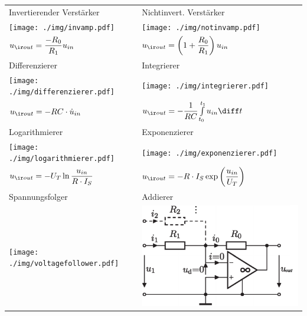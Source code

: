 \documentclass[fs, footer]{latex4ei}
\begin{document}
\begin{multicols*}{4}
    \begin{tabular}{ll}
        Invertierender Verstärker                                & Nichtinvert. Verstärker                                              \\
        \texttt{[image: ./img/invamp.pdf]}          & \texttt{[image: ./img/notinvamp.pdf]}                   \\
        $u_{\ir out} = \frac{-R_0}{R_1} u_{in}$                  & $u_{\ir out} = \left( 1+ \frac{R_0}{R_1} \right) u_{in}$             \\[0.5em] \mrule
        Differenzierer                                           & Integrierer                                                          \\
        \texttt{[image: ./img/differenzierer.pdf]}  & \texttt{[image: ./img/integrierer.pdf]}                 \\
        $u_{\ir out} = -RC \cdot \dot u_{in}$                    & $u_{\ir out} = -\frac{1}{RC} \int\limits^{t_1}_{t_0} u_{in} \diff t$ \\ \mrule
        Logarithmierer                                           & Exponenzierer                                                        \\
        \texttt{[image: ./img/logarithmierer.pdf]}  & \texttt{[image: ./img/exponenzierer.pdf]}               \\
        $u_{\ir out} = -U_T \ln \frac{u_{in}}{R \cdot I_S}$      & $u_{\ir out} = -R \cdot I_S \exp \left( \frac{u_{in}}{U_T} \right)$  \\ \mrule
        Spannungsfolger                                          & Addierer                                                           \\
        \texttt{[image: ./img/voltagefollower.pdf]} & \includegraphics[scale = 0.45]{./img/addierer.pdf}                                                                     \\

\end{tabular}
\end{multicols*}
\end{document}
